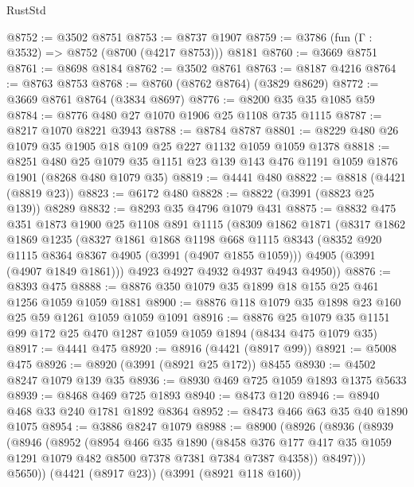 \begin{lexlean}{RustStd}
\begin{coremodule}
@8752 := @3502 @8751
@8753 := @8737 @1907
@8759 := @3786 (fun (Γ : @3532) => @8752 (@8700 (@4217 @8753))) @8181
@8760 := @3669 @8751
@8761 := @8698 @8184
@8762 := @3502 @8761
@8763 := @8187 @4216
@8764 := @8763 @8753
@8768 := @8760 (@8762 @8764) (@3829 @8629)
@8772 := @3669 @8761 @8764 (@3834 @8697)
@8776 := @8200 @35 @35 @1085 @59
@8784 := @8776 @480 @27 @1070 @1906 @25 @1108 @735 @1115
@8787 := @8217 @1070 @8221 @3943
@8788 := @8784 @8787
@8801 := @8229 @480 @26 @1079 @35 @1905 @18 @109 @25 @227 @1132 @1059 @1059 @1378
@8818 := @8251
    @480
    @25
    @1079
    @35
    @1151
    @23
    @139
    @143
    @476
    @1191
    @1059
    @1876
    @1901
    (@8268 @480 @1079 @35)
@8819 := @4441 @480
@8822 := @8818 (@4421 (@8819 @23))
@8823 := @6172 @480
@8828 := @8822 (@3991 (@8823 @25 @139)) @8289
@8832 := @8293 @35 @4796 @1079 @431
@8875 := @8832
    @475
    @351
    @1873
    @1900
    @25
    @1108
    @891
    @1115
    (@8309
      @1862
      @1871
      (@8317
        @1862
        @1869
        @1235
        (@8327
          @1861
          @1868
          @1198
          @668
          @1115
          @8343
          (@8352 @920 @1115 @8364 @8367 @4905 (@3991 (@4907 @1855 @1059)))
          @4905
          (@3991 (@4907 @1849 @1861)))
        @4923
        @4927
        @4932
        @4937
        @4943
        @4950))
@8876 := @8393 @475
@8888 := @8876 @350 @1079 @35 @1899 @18 @155 @25 @461 @1256 @1059 @1059 @1881
@8900 := @8876 @118 @1079 @35 @1898 @23 @160 @25 @59 @1261 @1059 @1059 @1091
@8916 := @8876 @25 @1079 @35 @1151 @99 @172 @25 @470 @1287 @1059 @1059 @1894 (@8434 @475 @1079 @35)
@8917 := @4441 @475
@8920 := @8916 (@4421 (@8917 @99))
@8921 := @5008 @475
@8926 := @8920 (@3991 (@8921 @25 @172)) @8455
@8930 := @4502 @8247 @1079 @139 @35
@8936 := @8930 @469 @725 @1059 @1893 @1375 @5633
@8939 := @8468 @469 @725 @1893
@8940 := @8473 @120
@8946 := @8940 @468 @33 @240 @1781 @1892 @8364
@8952 := @8473 @466 @63 @35 @40 @1890 @1075
@8954 := @3886 @8247 @1079
@8988 := @8900
    (@8926
      (@8936
        (@8939
          (@8946
            (@8952
              (@8954
                @466
                @35
                @1890
                (@8458
                  @376
                  @177
                  @417
                  @35
                  @1059
                  @1291
                  @1079
                  @482
                  @8500
                  @7378
                  @7381
                  @7384
                  @7387
                  @4358))
              @8497)))
        @5650))
    (@4421 (@8917 @23))
    (@3991 (@8921 @118 @160))

\end{coremodule}
\end{lexlean}

